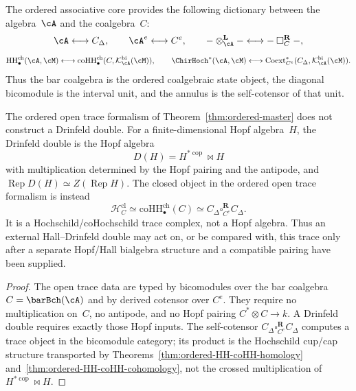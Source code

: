 \begin{remark}
\label{rem:ordered-dictionary}
The ordered associative core provides the following dictionary
between the algebra~$\cA$ and the coalgebra~$C$:
\[
 \cA \longleftrightarrow C_\Delta,
 \qquad
 \cA^e \longleftrightarrow C^e,
 \qquad
 {-}\otimes_\cA^{\mathbf{L}}{-}
 \longleftrightarrow
 {-}\mathbin{\square}_C^{\mathbf{R}}{-},
\]
\[
 \mathrm{HH}^{\mathrm{ch}}_\bullet(\cA, \cM)
 \longleftrightarrow
 \mathrm{coHH}^{\mathrm{ch}}_\bullet
 (C, \mathcal{K}_\cA^{\mathrm{bi}}(\cM)),
 \qquad
\ChirHoch^*(\cA, \cM)
 \longleftrightarrow
 \mathrm{Coext}_{C^e}^*
 (C_\Delta, \mathcal{K}_\cA^{\mathrm{bi}}(\cM)).
\]
Thus the bar coalgebra is the ordered coalgebraic state object, the
diagonal bicomodule is the interval unit, and the annulus is the
self-cotensor of that unit.
\end{remark}

\begin{proposition}
\label{prop:open-trace-not-drinfeld-double}
The ordered open trace formalism of
Theorem~\textup{\ref{thm:ordered-master}} does not construct a
Drinfeld double.  For a finite-dimensional Hopf algebra~$H$, the
Drinfeld double is the Hopf algebra
\[
 D(H)=H^{*\operatorname{cop}}\bowtie H
\]
with multiplication determined by the Hopf pairing and the antipode,
and $\operatorname{Rep}D(H)\simeq Z(\operatorname{Rep}H)$.
The closed object in the ordered open trace formalism is instead
\[
 \mathcal H_C^{\mathrm{cl}}
 \simeq \mathrm{coHH}^{\mathrm{ch}}_\bullet(C)
 \simeq C_\Delta\square_{C^e}^{\mathbf R}C_\Delta.
\]
It is a Hochschild/coHochschild trace complex, not a Hopf algebra.
Thus an external Hall--Drinfeld double may act on, or be compared
with, this trace only after a separate Hopf/Hall bialgebra structure
and a compatible pairing have been supplied.
\end{proposition}

\begin{proof}
The open trace data are typed by bicomodules over the bar coalgebra
$C=\barBch(\cA)$ and by derived cotensor over $C^e$.  They require no
multiplication on~$C$, no antipode, and no Hopf pairing
$C^*\otimes C\to k$.  A Drinfeld double requires exactly those Hopf
inputs.  The self-cotensor
$C_\Delta\square_{C^e}^{\mathbf R}C_\Delta$ computes a trace object
in the bicomodule category; its product is the Hochschild cup/cap
structure transported by Theorems~\ref{thm:ordered-HH-coHH-homology}
and~\ref{thm:ordered-HH-coHH-cohomology}, not the crossed
multiplication of $H^{*\operatorname{cop}}\bowtie H$.
\end{proof}

